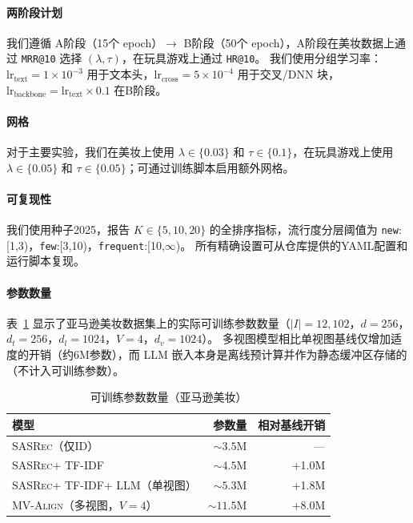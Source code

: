 \documentclass[sigconf,natbib=true]{acmart}
\newcommand{\model}{\textsc{MV-Align}\xspace}
\newcommand{\base}{\textsc{SASRec}\xspace}
\newcommand{\tfidf}{\textsc{TF-IDF}\xspace}
\newcommand{\llm}{\textsc{LLM}\xspace}
\begin{document}
\paragraph{两阶段计划}
我们遵循 A阶段（15个 epoch）$\rightarrow$ B阶段（50个 epoch），A阶段在美妆数据上通过 \texttt{MRR@10} 选择 $(\lambda,\tau)$，在玩具游戏上通过 \texttt{HR@10}。
我们使用分组学习率：$\text{lr}_{\text{text}}=1\times10^{-3}$ 用于文本头，$\text{lr}_{\text{cross}}=5\times10^{-4}$ 用于交叉/DNN 块，$\text{lr}_{\text{backbone}}=\text{lr}_{\text{text}}\times 0.1$ 在B阶段。

\paragraph{网格}
对于主要实验，我们在美妆上使用 $\lambda\in\{0.03\}$ 和 $\tau\in\{0.1\}$，在玩具游戏上使用 $\lambda\in\{0.05\}$ 和 $\tau\in\{0.05\}$；可通过训练脚本启用额外网格。

\paragraph{可复现性}
我们使用种子2025，报告 $K\in\{5,10,20\}$ 的全排序指标，流行度分层阈值为 \texttt{new}:[1,3)，\texttt{few}:[3,10)，\texttt{frequent}:[10,$\infty$)。
所有精确设置可从仓库提供的YAML配置和运行脚本复现。

\paragraph{参数数量}
表~\ref{tab:params} 显示了亚马逊美妆数据集上的实际可训练参数数量（$|I|=12,102$，$d=256$，$d_t=256$，$d_l=1024$，$V=4$，$d_v=1024$）。
多视图模型相比单视图基线仅增加适度的开销（约6M参数），而 \llm 嵌入本身是离线预计算并作为静态缓冲区存储的（不计入可训练参数）。

\begin{table}[h]
\caption{可训练参数数量（亚马逊美妆）}
\label{tab:params}
\centering
\small
\begin{tabular}{lrr}
\toprule
\textbf{模型} & \textbf{参数量} & \textbf{相对基线开销} \\
\midrule
\base（仅ID） & ${\sim}3.5$M & --- \\
\base + \tfidf & ${\sim}4.5$M & +1.0M \\
\base + \tfidf + \llm（单视图） & ${\sim}5.3$M & +1.8M \\
\model（多视图，$V{=}4$） & ${\sim}11.5$M & +8.0M \\
\bottomrule
\end{tabular}
\end{table}
\end{document}
